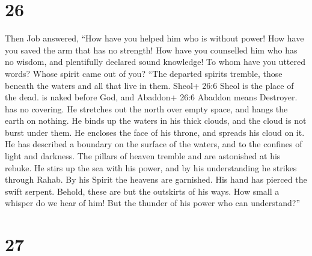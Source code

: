 \hypertarget{section-15}{%
\section{26}\label{section-15}}

 Then Job answered,  ``How have you helped him
who is without power! How have you saved the arm that has no strength!
 How have you counselled him who has no wisdom, and
plentifully declared sound knowledge!  To whom have you
uttered words? Whose spirit came out of you?  ``The departed
spirits tremble, those beneath the waters and all that live in them.
 Sheol+ 26:6 Sheol is the place of the dead. is naked before
God, and Abaddon+ 26:6 Abaddon means Destroyer. has no covering.
 He stretches out the north over empty space, and hangs the
earth on nothing.  He binds up the waters in his thick
clouds, and the cloud is not burst under them.  He encloses
the face of his throne, and spreads his cloud on it.  He
has described a boundary on the surface of the waters, and to the
confines of light and darkness.  The pillars of heaven
tremble and are astonished at his rebuke.  He stirs up the
sea with his power, and by his understanding he strikes through Rahab.
 By his Spirit the heavens are garnished. His hand has
pierced the swift serpent.  Behold, these are but the
outskirts of his ways. How small a whisper do we hear of him! But the
thunder of his power who can understand?''

\hypertarget{section-16}{%
\section{27}\label{section-16}}

